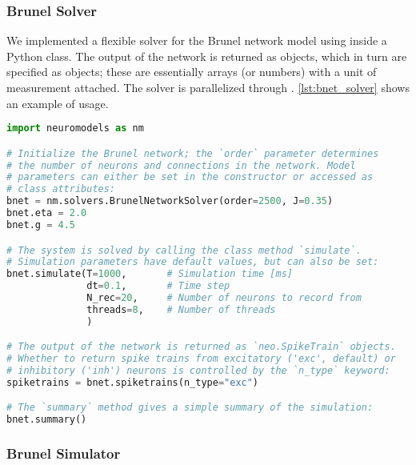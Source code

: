 \subsubsection*{Brunel Solver} 

We implemented a flexible solver for the Brunel network model using  inside a Python class. The output of the network is returned as  objects, which in turn are specified as  objects; these are essentially arrays (or numbers) with a unit of measurement attached. The solver is parallelized through . \cref{lst:bnet_solver} shows an example of usage.

\begin{lstlisting}[language=python, label={lst:bnet_solver}, caption={Example usage of the Brunel network model solver.}]
import neuromodels as nm

# Initialize the Brunel network; the `order` parameter determines
# the number of neurons and connections in the network. Model
# parameters can either be set in the constructor or accessed as
# class attributes:
bnet = nm.solvers.BrunelNetworkSolver(order=2500, J=0.35)
bnet.eta = 2.0
bnet.g = 4.5

# The system is solved by calling the class method `simulate`.
# Simulation parameters have default values, but can also be set:
bnet.simulate(T=1000,       # Simulation time [ms]
              dt=0.1,       # Time step
              N_rec=20,     # Number of neurons to record from
              threads=8,    # Number of threads
              )

# The output of the network is returned as `neo.SpikeTrain` objects.
# Whether to return spike trains from excitatory ('exc', default) or
# inhibitory ('inh') neurons is controlled by the `n_type` keyword:
spiketrains = bnet.spiketrains(n_type="exc")

# The `summary` method gives a simple summary of the simulation:
bnet.summary()
\end{lstlisting}

\subsubsection*{Brunel Simulator} 

